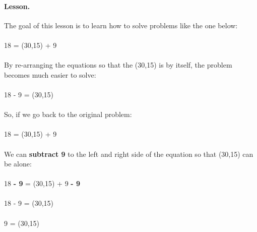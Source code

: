 \documentclass[12pt]{article}
\begin{document}
\newpage


\paragraph{Lesson.}
The goal of this lesson is to learn how to solve problems like the one below: \\
\\
18 = \framebox(30,15){} + 9
\\
\\
By re-arranging the equations so that the \framebox(30,15){} is by itself, the problem becomes much easier to solve: \\
\\
18 - 9 = \framebox(30,15){}
\\
\\
So, if we go back to the original problem: \\
\\
18 = \framebox(30,15){} + 9
\\
\\
We can \textbf{subtract 9} to the left and right side of the equation so that \framebox(30,15){} can be alone: \\
\\
18 \textbf{- 9} = \framebox(30,15){} + 9 \textbf{- 9} \\
\\
18 - 9 = \framebox(30,15){} \\
\\
9 = \framebox(30,15){}

\newpage


\newpage
\end{document}
